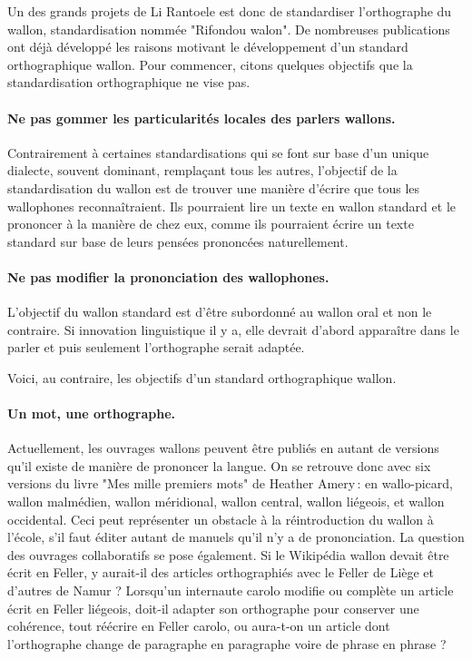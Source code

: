 \documentclass[french]{article}
\begin{document}
Un des grands projets de Li Rantoele est donc de standardiser l'orthographe du wallon, standardisation nommée "Rifondou walon". De nombreuses publications ont déjà développé les raisons motivant le développement d'un standard orthographique wallon. Pour commencer, citons quelques objectifs que la standardisation orthographique ne vise pas.

\paragraph{Ne pas gommer les particularités locales des parlers wallons.} Contrairement à certaines standardisations qui se font sur base d'un unique dialecte, souvent dominant, remplaçant tous les autres, l'objectif de la standardisation du wallon est de trouver une manière d'écrire que tous les wallophones reconnaîtraient. Ils pourraient lire un texte en wallon standard et le prononcer à la manière de chez eux, comme ils pourraient écrire un texte standard sur base de leurs pensées prononcées naturellement.

\paragraph{Ne pas modifier la prononciation des wallophones.} L'objectif du wallon standard est d'être subordonné au wallon oral et non le contraire. Si innovation linguistique il y a, elle devrait d'abord apparaître dans le parler et puis seulement l'orthographe serait adaptée.

Voici, au contraire, les objectifs d'un standard orthographique wallon.

\paragraph{Un mot, une orthographe.} Actuellement, les ouvrages wallons peuvent être publiés en autant de versions qu'il existe de manière de prononcer la langue. On se retrouve donc avec six versions du livre "Mes mille premiers mots" de Heather Amery\,: en wallo-picard, wallon malmédien, wallon méridional, wallon central, wallon liégeois, et wallon occidental. Ceci peut représenter un obstacle à la réintroduction du wallon à l'école, s'il faut éditer autant de manuels qu'il n'y a de prononciation. La question des ouvrages collaboratifs se pose également. Si le Wikipédia wallon devait être écrit en Feller, y aurait-il des articles orthographiés avec le Feller de Liège et d'autres de Namur ? Lorsqu'un internaute carolo modifie ou complète un article écrit en Feller liégeois, doit-il adapter son orthographe pour conserver une cohérence, tout réécrire en Feller carolo, ou aura-t-on un article dont l'orthographe change de paragraphe en paragraphe voire de phrase en phrase ?
\end{document}
